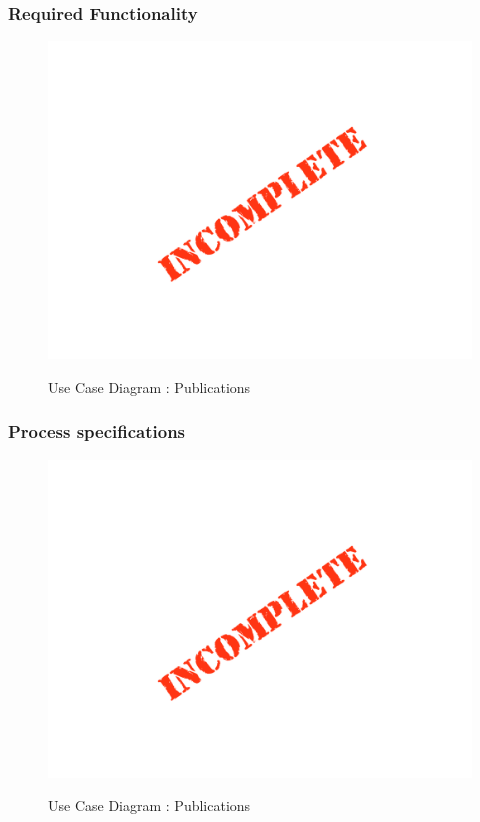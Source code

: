 \documentclass{article}
\begin{document}
		\subsubsection{Required Functionality}

		\begin{figure}[H]
		\includegraphics[width=\textwidth]{images/Incomplete.png}  \\
		\caption{Use Case Diagram : Publications}
		\end{figure}

		\subsubsection{Process specifications}

		\begin{figure}[H]
		\includegraphics[width=\textwidth]{images/Incomplete.png}  \\
		\caption{Use Case Diagram : Publications}
		\end{figure}
\end{document}
